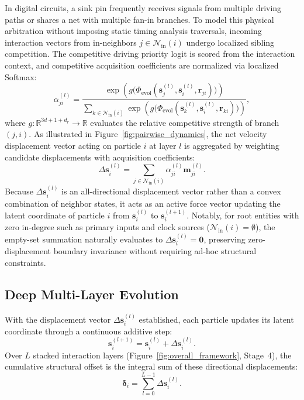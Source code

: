 In digital circuits, a sink pin frequently receives signals from multiple driving paths or shares a net with multiple fan-in branches. To model this physical arbitration without imposing static timing analysis traversals, incoming interaction vectors from in-neighbors $j \in \mathcal{N}_{\text{in}}(i)$ undergo localized sibling competition. The competitive driving priority logit is scored from the interaction context, and competitive acquisition coefficients are normalized via localized Softmax:
\begin{equation}
    \alpha_{ji}^{(l)} = \frac{\exp\!\left(g\big(\Phi_{\text{evol}}(\mathbf{s}_j^{(l)}, \mathbf{s}_i^{(l)}, \mathbf{r}_{ji})\big)\right)}{\sum_{k \in \mathcal{N}_{\text{in}}(i)} \exp\!\left(g\big(\Phi_{\text{evol}}(\mathbf{s}_k^{(l)}, \mathbf{s}_i^{(l)}, \mathbf{r}_{ki})\big)\right)},
    \label{eq:sibling_competition}
\end{equation}
where $g: \mathbb{R}^{3d + 1 + d_r} \to \mathbb{R}$ evaluates the relative competitive strength of branch $(j, i)$. As illustrated in Figure~\ref{fig:pairwise_dynamics}, the net velocity displacement vector acting on particle $i$ at layer $l$ is aggregated by weighting candidate displacements with acquisition coefficients:
\begin{equation}
    \Delta \mathbf{s}_i^{(l)} = \sum_{j \in \mathcal{N}_{\text{in}}(i)} \alpha_{ji}^{(l)} \mathbf{m}_{ji}^{(l)}.
    \label{eq:displacement_agg}
\end{equation}
Because $\Delta \mathbf{s}_i^{(l)}$ is an all-directional displacement vector rather than a convex combination of neighbor states, it acts as an active force vector updating the latent coordinate of particle $i$ from $\mathbf{s}_i^{(l)}$ to $\mathbf{s}_i^{(l+1)}$. Notably, for root entities with zero in-degree such as primary inputs and clock sources ($\mathcal{N}_{\text{in}}(i) = \emptyset$), the empty-set summation naturally evaluates to $\Delta \mathbf{s}_i^{(l)} = \mathbf{0}$, preserving zero-displacement boundary invariance without requiring ad-hoc structural constraints.

\renderFigureMeters{}

\subsection{Deep Multi-Layer Evolution}
\label{sec:method_evolution}

With the displacement vector $\Delta \mathbf{s}_i^{(l)}$ established, each particle updates its latent coordinate through a continuous additive step:
\begin{equation}
    \mathbf{s}_i^{(l+1)} = \mathbf{s}_i^{(l)} + \Delta \mathbf{s}_i^{(l)}.
    \label{eq:layer_update}
\end{equation}
Over $L$ stacked interaction layers (Figure~\ref{fig:overall_framework}, Stage~4), the cumulative structural offset is the integral sum of these directional displacements:
\begin{equation}
    \boldsymbol{\delta}_i = \sum_{l=0}^{L-1} \Delta \mathbf{s}_i^{(l)}.
    \label{eq:accumulated_delta}
\end{equation}

